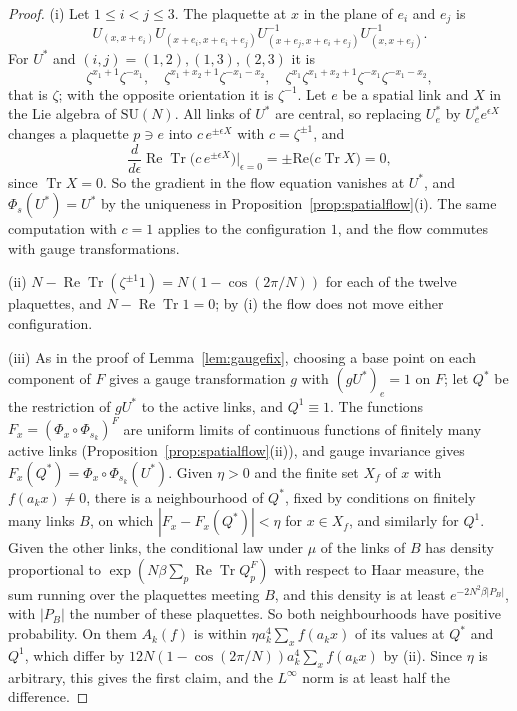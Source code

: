\documentclass[aps,prd,twocolumn,superscriptaddress,nofootinbib,longbibliography,floatfix,amsmath,amssymb,10pt]{revtex4-2}
\theoremstyle{definition}
\theoremstyle{remark}
\newcommand{\SU}{\mathrm{SU}}
\newcommand{\Tr}{\operatorname{Tr}}
\newcommand{\ReTr}{\operatorname{Re}\operatorname{Tr}}
\begin{document}
\begin{proof}
(i) Let $1\le i<j\le3$. The plaquette at $x$ in the plane of $e_i$ and $e_j$ is
\[
U_{(x,x+e_i)}U_{(x+e_i,x+e_i+e_j)}U^{-1}_{(x+e_j,x+e_i+e_j)}U^{-1}_{(x,x+e_j)} .
\]
For $U^*$ and $(i,j)=(1,2),(1,3),(2,3)$ it is
\[
\zeta^{x_1+1}\zeta^{-x_1},\quad\zeta^{x_1+x_2+1}\zeta^{-x_1-x_2},\quad
\zeta^{x_1}\zeta^{x_1+x_2+1}\zeta^{-x_1}\zeta^{-x_1-x_2},
\]
that is $\zeta$; with the opposite orientation it is $\zeta^{-1}$. Let $e$ be a
spatial link and $X$ in the Lie algebra of $\SU(N)$. All links of $U^*$
are central, so replacing $U^*_e$ by $U^*_ee^{\epsilon X}$ changes a
plaquette $p\ni e$ into $c\,e^{\pm\epsilon X}$ with $c=\zeta^{\pm1}$, and
\[
\frac d{d\epsilon}\ReTr\bigl(c\,e^{\pm\epsilon X}\bigr)\Big|_{\epsilon=0}
=\pm\mathrm{Re}\bigl(c\Tr X\bigr)=0 ,
\]
since $\Tr X=0$. So the gradient in the flow equation vanishes at $U^*$,
and $\Phi_s(U^*)=U^*$ by the uniqueness in
Proposition~\ref{prop:spatialflow}(i). The same computation with $c=1$
applies to the configuration $1$, and the flow commutes with gauge
transformations.

(ii) $N-\ReTr(\zeta^{\pm1}1)=N(1-\cos(2\pi/N))$ for each of the twelve
plaquettes, and $N-\ReTr1=0$; by (i) the flow does not move either
configuration.

(iii) As in the proof of Lemma~\ref{lem:gaugefix}, choosing a base point
on each component of $F$ gives a gauge transformation $g$ with
$(gU^*)_e=1$ on $F$; let $Q^*$ be the restriction of $gU^*$ to the active
links, and $Q^1\equiv1$. The functions $F_x=(\Phi_x\circ\Phi_{s_k})^F$ are
uniform limits of continuous functions of finitely many active links
(Proposition~\ref{prop:spatialflow}(ii)), and gauge invariance gives
$F_x(Q^*)=\Phi_x\circ\Phi_{s_k}(U^*)$. Given $\eta>0$ and the finite set
$X_f$ of $x$ with $f(a_kx)\ne0$, there is a neighbourhood of $Q^*$, fixed
by conditions on finitely many links $B$, on which $|F_x-F_x(Q^*)|<\eta$
for $x\in X_f$, and similarly for $Q^1$. Given the other links, the
conditional law under $\mu$ of the links of $B$ has density
proportional to $\exp(N\beta\sum_p\ReTr Q^F_p)$ with respect to Haar
measure, the sum running over the plaquettes meeting $B$, and this density
is at least $e^{-2N^2\beta|P_B|}$, with $|P_B|$ the number of these
plaquettes. So both neighbourhoods have positive probability. On them
$A_k(f)$ is within $\eta a_k^4\sum_xf(a_kx)$ of its values at $Q^*$ and
$Q^1$, which differ by $12N(1-\cos(2\pi/N))a_k^4\sum_xf(a_kx)$ by (ii).
Since $\eta$ is arbitrary, this gives the first claim, and the
$L^\infty$ norm is at least half the difference.
\end{proof}
\end{document}
